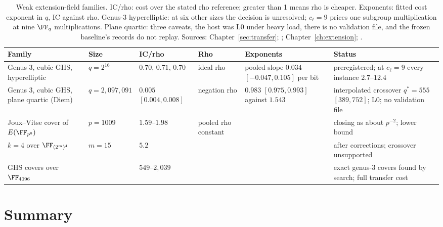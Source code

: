 \begin{table}[t]
\centering\small
\begin{tabularx}{\linewidth}{@{}>{\raggedright}p{3.1cm}l>{\raggedright}p{2.2cm}>{\raggedright}p{2.0cm}>{\raggedright}p{2.2cm}>{\raggedright\arraybackslash}X@{}}
\toprule
Family & Size & IC/rho & Rho & Exponents & Status \\
\midrule
Genus 3, cubic GHS, hyperelliptic & $q=2^{16}$ & $0.70$, $0.71$, $0.70$ &
  ideal rho & pooled slope $0.034$ $[-0.047,0.105]$ per bit &
  preregistered; at $c_\ell=9$ every instance $2.7$--$12.4$ \\
Genus 3, cubic GHS, plane quartic (Diem) & $q=2{,}097{,}091$ & $0.005$
  $[0.004,0.008]$ & negation rho & $0.983$ $[0.975,0.993]$ against $1.543$
  & interpolated crossover $q^*=555$ $[389,752]$; L0; no validation file \\
\addlinespace
Joux--Vitse cover of $E(\FF_{p^6})$ & $p=1009$ & $1.59$--$1.98$ & pooled
  rho constant & & closing as about $p^{-2}$; lower bound \\
\addlinespace
$k=4$ over $\FF_{(2^m)^4}$ & $m=15$ & $5.2$ & & & after corrections;
  crossover unsupported \\
\addlinespace
GHS covers over $\FF_{4096}$ & & $549$--$2{,}039$ & & & exact genus-3
  covers found by search; full transfer cost \\
\bottomrule
\end{tabularx}
\caption[]{Weak extension-field families. IC/rho: cost over the stated rho
reference; greater than 1 means rho is cheaper. Exponents: fitted cost
exponent in $q$, IC against rho. Genus-3 hyperelliptic: at six other sizes
the decision is unresolved; $c_\ell=9$ prices one subgroup multiplication
at nine $\FF_q$ multiplications. Plane quartic: three caveats, the host was
L0 under heavy load, there is no validation file, and the frozen baseline's
records do not replay. Sources: Chapter~\ref{sec:transfer};
; Chapter~\ref{ch:extension};
.}
\label{tab:distance-weak}
\end{table}

\section{Summary}

